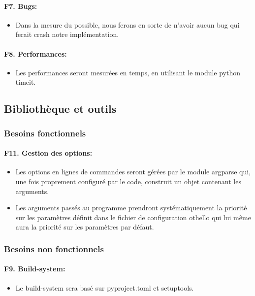 \documentclass[a4paper,12pt]{article}
\begin{document}
\paragraph{F7. Bugs:}
\begin{itemize}
  \item Dans la mesure du possible, nous ferons en sorte de n'avoir aucun bug qui
        ferait crash notre implémentation.
\end{itemize}

\paragraph{F8. Performances:}
\begin{itemize}
  \item Les performances seront mesurées en temps, en utilisant le module python
        timeit.
\end{itemize}

\subsection{Bibliothèque et outils}

\subsubsection{Besoins fonctionnels}

\paragraph{F11. Gestion des options:}
\begin{itemize}
  \item Les options en lignes de commandes seront gérées par le module argparse qui,
        une fois proprement configuré par le code, construit un objet contenant les
        arguments.
  \item Les arguments passés au programme prendront systématiquement la priorité sur
        les paramètres définit dans le fichier de configuration othello qui lui même
        aura la priorité sur les paramètres par défaut.
\end{itemize}

\subsubsection{Besoins non fonctionnels}

\paragraph{F9. Build-system:}
\begin{itemize}
  \item Le build-system sera basé sur pyproject.toml et setuptools.
\end{itemize}
\end{document}
